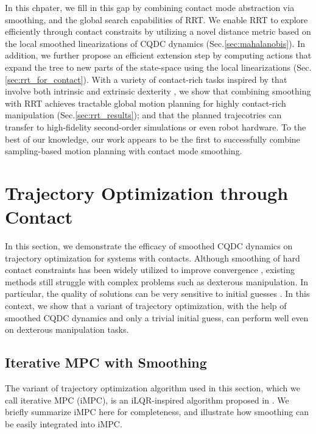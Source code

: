 In this chpater, we fill in this gap by combining contact mode abstraction via smoothing, and the global search capabilities of RRT. We enable RRT to explore efficiently through contact constraits by utilizing a novel distance metric based on the local smoothed linearizations of CQDC dynamics (Sec.\ref{sec:mahalanobis}). In addition, we further propose an efficient extension step by computing actions that expand the tree to new parts of the state-space using the local linearizations (Sec.\ref{sec:rrt_for_contact}). With a variety of contact-rich tasks inspired by \cite{rajeswaran2018learning} that involve both intrinsic and extrinsic dexterity \cite{extrinsic}, we show that combining smoothing with RRT achieves tractable global motion planning for highly contact-rich manipulation (Sec.\ref{sec:rrt_results}); and that the planned trajecotries can transfer to high-fidelity second-order simulations or even robot hardware. To the best of our knowledge, our work appears to be the first to successfully combine sampling-based motion planning with contact mode smoothing.

\section{Trajectory Optimization through Contact \label{sec:traj_opt}}
\noindent 
In this section, we demonstrate the efficacy of smoothed CQDC dynamics on trajectory optimization for systems with contacts.
Although smoothing of hard contact constraints has been widely utilized to improve convergence \cite{posa2014direct, howell2022dojo, howell2022trajectory}, existing methods still struggle with complex problems such as dexterous manipulation. In particular, the quality of solutions can be very sensitive to initial guesses \cite{onol2020tuning}.
In this context, we show that a variant of trajectory optimization, with the help of smoothed CQDC dynamics and only a trivial initial guess, can perform well even on dexterous manipulation tasks.

\subsection{Iterative MPC with Smoothing \label{sec:iMPC}}
The variant of trajectory optimization algorithm used in this section, which we call iterative MPC (iMPC), is an iLQR-inspired algorithm proposed in \cite{bundledgradients}. We briefly summarize iMPC here for completeness, and illustrate how smoothing can be easily integrated into iMPC.

